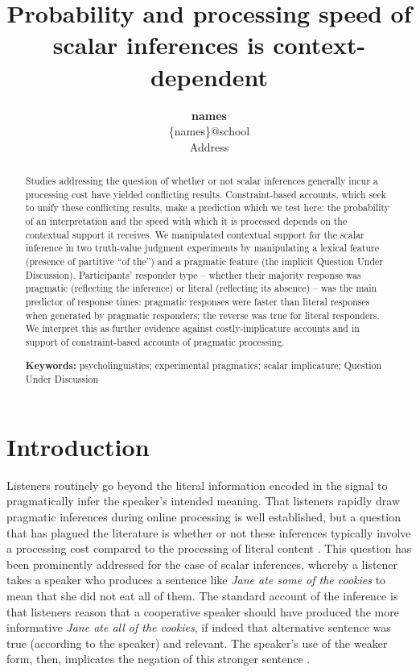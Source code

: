 \documentclass[10pt,letterpaper]{article}
\title{Probability and processing speed of scalar inferences is context-dependent}
\author{{\large \textbf{names}}  \\
 \{names\}@school\\
  Address}
\begin{document}
\maketitle


\begin{abstract}

Studies addressing the question of whether or not scalar inferences generally incur a processing cost  have yielded conflicting results. Constraint-based accounts, which seek to unify these conflicting results, make a prediction which we test here: the probability of an interpretation and the speed with which it is processed depends on the contextual support it receives. We manipulated contextual support for the scalar inference in two truth-value judgment experiments  by manipulating a lexical feature (presence of partitive ``of the'') and a pragmatic feature (the implicit Question Under Discussion). Participants' responder type -- whether their majority response was pragmatic (reflecting the inference) or literal (reflecting its absence) -- was the main predictor of response times: pragmatic responses  were faster than literal responses when generated by pragmatic responders; the reverse was true for literal responders. We interpret this as further evidence against costly-implicature accounts and in support of constraint-based accounts of pragmatic processing.

\textbf{Keywords:} psycholinguistics; experimental pragmatics; scalar implicature; Question Under Discussion

\end{abstract}

\section{Introduction}

Listeners routinely go beyond the literal information encoded in the signal to pragmatically infer the speaker's intended meaning. That listeners rapidly draw pragmatic inferences during online processing is well established, but a question that has plagued the literature is whether or not these inferences typically involve a processing cost compared to the processing of literal content \cite{BottNoveck2004,BrehenyEtAl2006,HuangSnedeker2009,HuangSnedeker2011,Grodner2010,Breheny2013,DegenTanenhaus2016,DeNeysSchaeken2007,TomlinsonEtAl2012}. This question has been prominently addressed for the case of scalar inferences, whereby a listener takes a speaker who produces a sentence like \textit{Jane ate some of the cookies} to mean that she did not eat all of them. The standard account of the inference is that listeners reason that a cooperative speaker should have produced the more informative \emph{Jane ate all of the cookies}, if indeed that alternative sentence was true (according to the speaker) and relevant. The speaker's use of the weaker form, then, implicates the negation of this stronger sentence \cite{Grice1975}.
\end{document}
